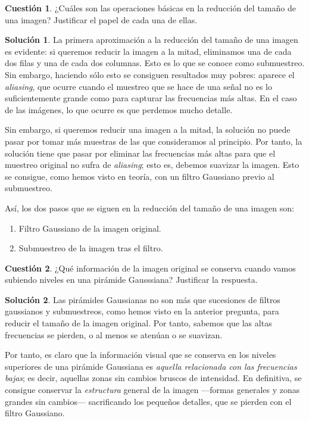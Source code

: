 \documentclass[a4paper, 11pt]{article}
\theoremstyle{definition}
\newtheorem*{solucion}{Solución}
\theoremstyle{theorem}
\newtheorem{cuestion}{Cuestión}
\begin{document}
  \begin{cuestion}
      ¿Cuáles son las operaciones básicas en la reducción del tamaño de una imagen? Justificar el papel de cada una de ellas.
  \end{cuestion}

  \begin{solucion}
      La primera aproximación a la reducción del tamaño de una imagen es evidente: si queremos reducir la imagen a la mitad, eliminamos una de cada dos filas y una de cada dos columnas. Esto es lo que se conoce como submuestreo. Sin embargo, haciendo sólo esto se consiguen resultados muy pobres: aparece el \emph{aliasing}, que ocurre cuando el muestreo que se hace de una señal no es lo suficientemente grande como para capturar las frecuencias más altas. En el caso de las imágenes, lo que ocurre es que perdemos mucho detalle.

      Sin embargo, si queremos reducir una imagen a la mitad, la solución no puede pasar por tomar más muestras de las que consideramos al principio. Por tanto, la solución tiene que pasar por eliminar las frecuencias más altas para que el muestreo original no sufra de \emph{aliasing}; esto es, debemos suavizar la imagen. Esto se consigue, como hemos visto en teoría, con un filtro Gaussiano previo al submuestreo.

      Así, los dos pasos que se siguen en la reducción del tamaño de una imagen son:
      \begin{enumerate}
          \item Filtro Gaussiano de la imagen original.
          \item Submuestreo de la imagen tras el filtro.
      \end{enumerate}
  \end{solucion}

  \begin{cuestion}
      ¿Qué información de la imagen original se conserva cuando vamos subiendo niveles en una pirámide Gausssiana? Justificar la respuesta.
  \end{cuestion}

  \begin{solucion}
      Las pirámides Gaussianas no son más que sucesiones de filtros gaussianos y submuestreos, como hemos visto en la anterior pregunta, para reducir el tamaño de la imagen original. Por tanto, sabemos que las altas frecuencias se pierden, o al menos se atenúan o se suavizan.

      Por tanto, es claro que la información visual que se conserva en los niveles superiores de una pirámide Gaussiana es \emph{aquella relacionada con las frecuencias bajas}; es decir, aquellas zonas sin cambios bruscos de intensidad. En definitiva, se consigue conservar la \emph{estructura} general de la imagen ---formas generales y  zonas grandes sin cambios--- sacrificando los pequeños detalles, que se pierden con el filtro Gaussiano.
  \end{solucion}
\end{document}

